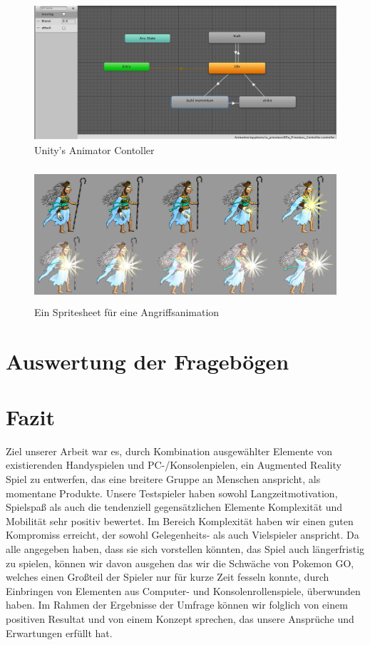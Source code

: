 \documentclass[extern,palatino]{cgBA}
\begin{document}
\begin{figure}[H]
	\centering
	\includegraphics[height=5cm]{animator.jpg}
	\caption{Unity's Animator Contoller}
\end{figure}
\begin{figure}[H]
	\centering
	\includegraphics[height=5cm]{attack.jpg}
	\caption{Ein Spritesheet für eine Angriffsanimation}
\end{figure}
	
\section{Auswertung der Fragebögen}	
\section{Fazit}Ziel unserer Arbeit war es, durch Kombination ausgewählter Elemente von existierenden Handyspielen und PC-/Konsolenpielen, ein Augmented Reality Spiel zu entwerfen, das eine breitere Gruppe an Menschen anspricht, als momentane Produkte. Unsere Testspieler haben sowohl Langzeitmotivation, Spielspaß als auch die tendenziell gegensätzlichen Elemente Komplexität und Mobilität sehr positiv bewertet. Im Bereich Komplexität haben wir einen guten Kompromiss erreicht, der sowohl Gelegenheits- als auch Vielspieler anspricht. Da alle angegeben haben, dass sie sich vorstellen könnten, das Spiel auch längerfristig zu spielen, können wir davon ausgehen das wir die Schwäche von Pokemon GO, welches einen Großteil der Spieler nur für kurze Zeit fesseln konnte, durch Einbringen von Elementen aus Computer- und Konsolenrollenspiele, überwunden haben. Im Rahmen der Ergebnisse der Umfrage können wir folglich von einem positiven Resultat und von einem Konzept sprechen, das unsere Ansprüche und Erwartungen erfüllt hat.
\newpage
\end{document}
